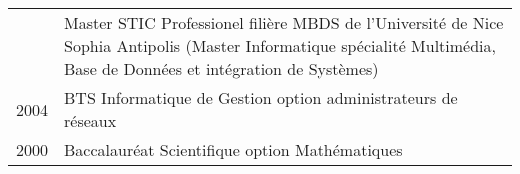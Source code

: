 \begin{tabular}{>{\small}r>{\small}p{14cm}}
 \parbox{\datebox}{} & Master STIC Professionel filière MBDS
 de l'Université de Nice Sophia Antipolis (Master Informatique spécialité Multimédia, Base de Données et
 intégration de Systèmes) \\ 
 2004 & BTS Informatique de Gestion option administrateurs de réseaux \\
 2000 & Baccalauréat Scientifique option Mathématiques
\end{tabular}